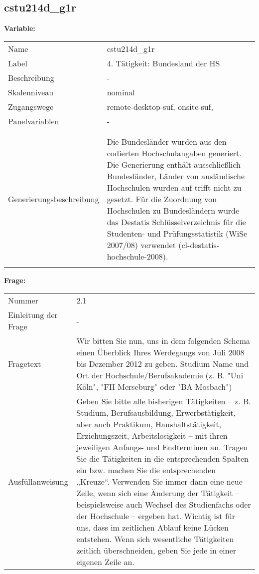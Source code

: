 	
	
	\subsection{cstu214d\_g1r}
	\label{subSection:cstu214d_g1r}

	\noindent\textbf{Variable:}\\
		\begin{tabular}{lL{11.3cm}}
			\label{tableVariable:cstu214d_g1r}
			Name & cstu214d\_g1r \\
			Label & 4. Tätigkeit: Bundesland der HS \\
			Beschreibung & - \\
			Skalenniveau & nominal \\
			Zugangswege &
				remote-desktop-suf,
				onsite-suf,
 \\
			Panelvariablen & -
			 \\
			 \\
 \\
					Generierungsbeschreibung & Die Bundesländer wurden aus den codierten Hochschulangaben generiert. Die Generierung enthält ausschließlich Bundesländer, Länder von ausländische Hochschulen wurden auf trifft nicht zu gesetzt. Für die Zuordnung von Hochschulen zu Bundesländern wurde das Destatis Schlüsselverzeichnis für die Studenten- und Prüfungsstatistik (WiSe 2007/08) verwendet (cl-destatis-hochschule-2008).
				 \\	
			 \\
		\end{tabular}

		\vspace*{1 cm}
		\noindent\textbf{Frage:}\\
		\begin{tabular}{lL{11.3cm}}
			\label{tableQuestion:cstu214d_g1r}
			Nummer & 2.1 \\
			Einleitung der Frage & - \\
			Fragetext & Wir bitten Sie nun, uns in dem folgenden Schema einen Überblick Ihres Werdegangs von Juli 2008 bis Dezember 2012 zu geben.
Studium
Name und Ort der Hochschule/Berufsakademie
(z. B. "Uni Köln", "FH Merseburg" oder "BA Mosbach") \\
			Ausfüllanweisung & Geben Sie bitte alle bisherigen Tätigkeiten – z. B. Studium, Berufsausbildung, Erwerbstätigkeit, aber auch Praktikum, Haushaltstätigkeit,
Erziehungszeit, Arbeitslosigkeit – mit ihren jeweiligen Anfangs- und Endterminen an. Tragen Sie die Tätigkeiten in die entsprechenden Spalten ein bzw. machen Sie die entsprechenden „Kreuze“. Verwenden Sie immer dann eine neue Zeile, wenn sich eine Änderung der Tätigkeit – beispielsweise auch Wechsel des Studienfachs oder der Hochschule – ergeben hat. Wichtig ist für uns, dass im zeitlichen Ablauf keine Lücken entstehen. Wenn sich wesentliche Tätigkeiten zeitlich überschneiden, geben Sie jede in einer eigenen Zeile an. \\
		\end{tabular}





